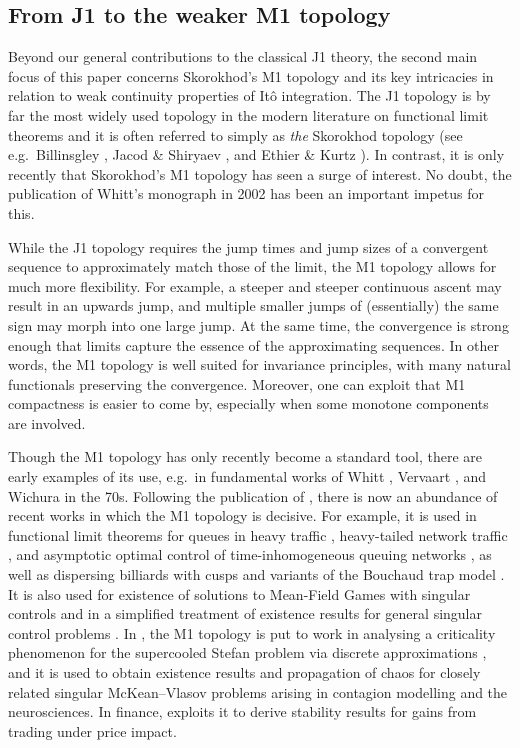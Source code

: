 \documentclass[11pt]{article}
\theoremstyle{definition}\newtheorem{example}[theorem]{Example}
\theoremstyle{definition}\newtheorem{counterexample}[theorem]{Counterexample}
\theoremstyle{definition}\newtheorem{remark}[theorem]{Remark}
\theoremstyle{definition}\newtheorem{defi}[theorem]{Definition}
\numberwithin{equation}{section}
\renewcommand{\|}{\; : \, \;}											%
\begin{document}
\subsection{From J1 to the weaker M1 topology}\label{sect:J1toM1}

Beyond our general contributions to the classical J1 theory, the second main focus of this paper concerns Skorokhod's M1 topology and its key intricacies in relation to weak continuity properties of It{\^o} integration. The J1 topology is by far the most widely used topology in the modern literature on functional limit theorems and it is often referred to simply as \emph{the} Skorokhod topology (see e.g.~Billinsgley \cite{billingsley}, Jacod \& Shiryaev \cite{shiryaev}, and Ethier \& Kurtz \cite{ethier_kurtz}). In contrast, it is only recently that Skorokhod's M1 topology has seen a surge of interest. No doubt, the publication of Whitt's monograph \cite{whitt} in 2002 has been an important impetus for this.

While the J1 topology requires the jump times and jump sizes of a convergent sequence to approximately match those of the limit, the M1 topology allows for much more flexibility. For example, a steeper and steeper continuous ascent may result in an upwards jump, and multiple smaller jumps of (essentially) the same sign may morph into one large jump. At the same time, the convergence is strong enough that limits capture the essence of the approximating sequences. In other words, the M1 topology is well suited for invariance principles, with many natural functionals preserving the convergence. Moreover, one can exploit that M1 compactness is easier to come by, especially when some monotone components are involved.


Though the M1 topology has only recently become a standard tool, there are early examples of its use, e.g.~in fundamental works of Whitt \cite{whitt1971,whitt2}, Vervaart \cite{Vervaat1972}, and Wichura \cite{Wichura1974} in the 70s. Following the publication of \cite{whitt}, there is now an abundance of recent works in which the M1 topology is decisive. For example, it is used in functional limit theorems for queues in heavy traffic \cite{PangWhitt}, heavy-tailed network traffic \cite{Mikosch}, and asymptotic optimal control of time-inhomogeneous queuing networks \cite{ramanan_M1}, as well as dispersing billiards with cusps \cite{Jung_Zhang, Melbourne_Varandas} and variants of the Bouchaud trap model \cite{arous_btm, croydonM1}. It is also used for existence of solutions to Mean-Field Games with singular controls \cite{Fu_Horst} and in a simplified treatment of existence results for general singular control problems \cite{Asaf_cohen_M1}. In \cite{Dembo_LiCheng}, the M1 topology is put to work in analysing a criticality phenomenon for the supercooled Stefan problem via discrete approximations \cite{Dembo_LiCheng}, and it is used to obtain existence results \cite{Nadtochiy_Skholni2} and propagation of chaos \cite{DIRT_SPA,mercy} for closely related singular McKean--Vlasov problems arising in contagion modelling and the neurosciences. In finance, \cite{Becherer_M1} exploits it to derive stability results for gains from trading under price impact.
\end{document}

